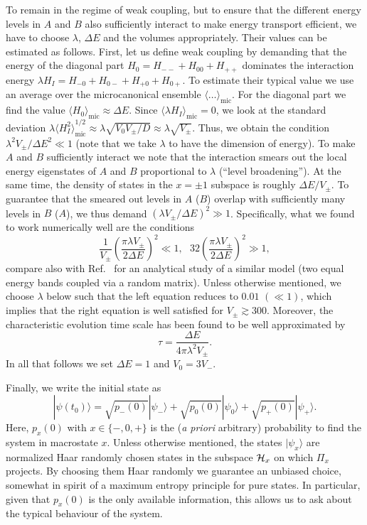\documentclass[pre,twocolumn,10pt,aps,longbibliography,nofootinbib]{revtex4-1}
\newcommand{\C}[1]{{\cal{#1}}}
\newcommand{\lr}[1]{{\langle {#1}\rangle}}
\begin{document}
To remain in the regime of weak coupling, but to ensure that the different energy levels in $A$ and $B$ also sufficiently interact to make energy transport efficient, we have to choose $\lambda$, $\Delta E$ and the volumes appropriately. Their values can be estimated as follows. First, let us define weak coupling by demanding that the energy of the diagonal part $H_0 = H_{--} + H_{00} + H_{++}$ dominates the interaction energy $\lambda H_I = H_{-0} + H_{0-} + H_{+0} + H_{0+}$. To estimate their typical value we use an average over the microcanonical ensemble $\lr{\dots}_\text{mic}$. For the diagonal part we find the value $\lr{H_0}_\text{mic} \approx \Delta E$. Since $\lr{\lambda H_I}_\text{mic} = 0$, we look at the standard deviation $\lambda\lr{H_I^2}_\text{mic}^{1/2} \approx \lambda \sqrt{V_0V_\pm/D} \approx \lambda\sqrt{V_\pm}$. Thus, we obtain the condition $\lambda^2V_\pm/\Delta E^2 \ll 1$ (note that we take $\lambda$ to have the dimension of energy). To make $A$ and $B$ sufficiently interact we note that the interaction smears out the local energy eigenstates of $A$ and $B$ proportional to $\lambda$ (``level broadening''). At the same time, the density of states in the $x=\pm1$ subspace is roughly $\Delta E/V_\pm$. To guarantee that the smeared out levels in $A$ ($B$) overlap with sufficiently many levels in $B$ ($A$), we thus demand $(\lambda V_\pm/\Delta E)^2 \gg1$. Specifically, what we found to work numerically well are the conditions
\begin{equation}\label{eq conditions epsilon}
 \frac{1}{V_\pm}\left(\frac{\pi\lambda V_\pm}{2\Delta E}\right)^2 \ll 1, ~~~
 32\left(\frac{\pi\lambda V_\pm}{2\Delta E}\right)^2 \gg 1,
\end{equation}
compare also with Ref.~\cite{BartschSteinigewegGemmerPRE2008} for an analytical study of a similar model (two equal energy bands coupled via a random matrix). Unless otherwise mentioned, we choose $\lambda$ below such that the left equation reduces to $0.01$ $(\ll 1)$, which implies that the right equation is well satisfied for $V_\pm\gtrsim300$. Moreover, the characteristic evolution time scale has been found to be well approximated by
\begin{equation}\label{eq tau}
 \tau = \frac{\Delta E}{4\pi\lambda^2V_\pm}.
\end{equation}
In all that follows we set $\Delta E = 1$ and $V_0 = 3V_-$.

Finally, we write the initial state as
\begin{equation}\label{eq initial state}
 |\psi(t_0)\rangle = \sqrt{p_-(0)}|\psi_-\rangle + \sqrt{p_0(0)}|\psi_0\rangle + \sqrt{p_+(0)}|\psi_+\rangle.
\end{equation}
Here, $p_x(0)$ with $x\in\{-,0,+\}$ is the (\emph{a priori} arbitrary) probability to find the system in macrostate $x$. Unless otherwise mentioned, the states $|\psi_x\rangle$ are normalized Haar randomly chosen states in the subspace $\C H_x$ on which $\Pi_x$ projects. By choosing them Haar randomly we guarantee an unbiased choice, somewhat in spirit of a maximum entropy principle for pure states. In particular, given that $p_x(0)$ is the only available information, this allows us to ask about the typical behaviour of the system.
\end{document}
